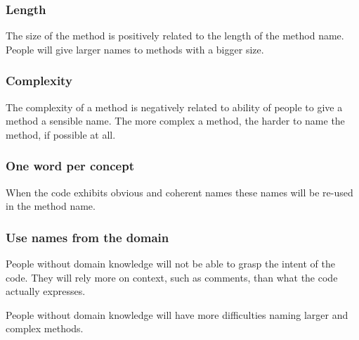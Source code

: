 \subsubsection{Length}
\begin{subhyp}
	\begin{hyp}
		The size of the method is positively related to the length of the method name. People will give larger names to methods with a bigger size.
	\end{hyp}
\end{subhyp}

\subsubsection{Complexity}
\begin{subhyp}
	\begin{hyp}
		The complexity of a method is negatively related to ability of people to give a method a sensible name. The more complex a method, the harder to name the method, if possible at all. 
	\end{hyp}
\end{subhyp}

\subsubsection{One word per concept}
\begin{subhyp}
	\begin{hyp}
		When the code exhibits obvious and coherent names these names will be re-used in the method name.
	\end{hyp}
\end{subhyp}

\subsubsection{Use names from the domain}
\begin{subhyp}
	\begin{hyp}
		People without domain knowledge will not be able to grasp the intent of the code. They will rely more on context, such as comments, than what the code actually expresses.
	\end{hyp}
	\begin{hyp}
		People without domain knowledge will have more difficulties naming larger and complex methods.
	\end{hyp}
\end{subhyp}




